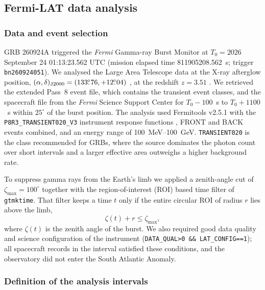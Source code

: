 
\subsection{Fermi-LAT data analysis}
\label{sec:lat}

\subsubsection{Data and event selection}
\label{sec:lat:data}

GRB 260924A triggered the \emph{Fermi} Gamma-ray Burst Monitor \citep[GBM;][]{Meegan2009} at
$T_0 = 2026$ September 24 01:13:23.562 UTC (mission elapsed time 811905208.562~s; trigger \texttt{bn260924051}).
We analysed the Large Area Telescope \citep[LAT;][]{Atwood2009} data at the X-ray afterglow position,
$(\alpha, \delta)_{\rm J2000} = (133\mbox{$.\!\!^\circ$}76, +12\mbox{$.\!\!^\circ$}04)$ \citep{XRTposition}, at the redshift $z = 3.51$ \citep{Redshift}.
We retrieved the extended Pass~8 event file, which contains the transient event classes, and the spacecraft file from
the \emph{Fermi} Science Support Center for $T_0-100$~s to $T_0+1100$~s within $25^\circ$ of the burst position.
The analysis used Fermitools v2.5.1 \citep{Fermitools2019} with the \texttt{P8R3\_TRANSIENT020\_V3} instrument
response functions \citep{Bruel2018}, FRONT and BACK events combined, and an energy range of 100~MeV--100~GeV.
\texttt{TRANSIENT020} is the class recommended for GRBs, where the source dominates the photon count over short
intervals and a larger effective area outweighs a higher background rate.

To suppress gamma rays from the Earth's limb we applied a zenith-angle cut of $\zeta_{\max} = 100^\circ$
together with the region-of-interest (ROI) based time filter of \texttt{gtmktime}. That filter keeps a time $t$
only if the entire circular ROI of radius $r$ lies above the limb,
\begin{equation}
  \zeta(t) + r \le \zeta_{\max},
  \label{eq:roicut}
\end{equation}
where $\zeta(t)$ is the zenith angle of the burst. We also required good data quality and science configuration of
the instrument (\texttt{DATA\_QUAL>0 \&\& LAT\_CONFIG==1}); all spacecraft records in the interval satisfied
these conditions, and the observatory did not enter the South Atlantic Anomaly.

\subsubsection{Definition of the analysis intervals}
\label{sec:lat:windows}


